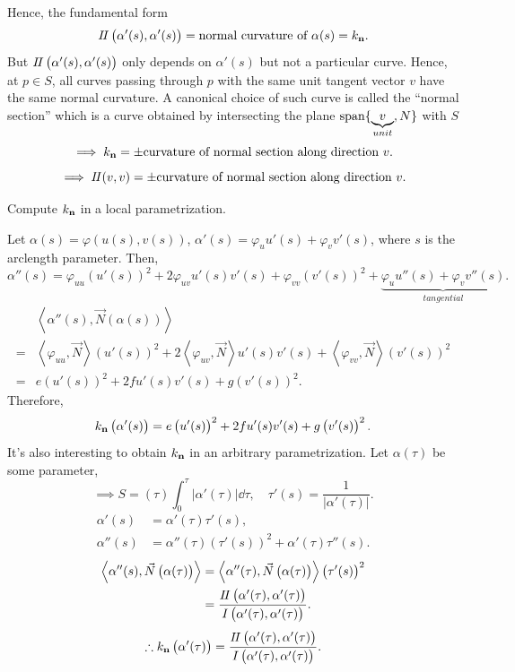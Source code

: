 Hence, the  fundamental form
\[
    I\!I\left(\alpha'(s),\alpha'(s)\right)    
    =\text{normal curvature of }\alpha(s)=k_{\vb{n}}.
\]
But \(I\!I\left(\alpha'(s),\alpha'(s)\right)\) only depends on 
\(\alpha'(s)\) but not a particular curve. Hence, at \(p\in S\), 
all curves passing through \(p\) with the same unit tangent vector
\(v\) have the same normal curvature. A canonical choice of
such curve is called the ``normal section'' which is a curve 
obtained by intersecting the plane \(\operatorname{span}\{\underbrace{v}_{unit},N\}\)
with \(S\)
\[
    \implies k_{\vb{n}}=\pm \text{curvature of normal section along
    direction }v.
\]
\[
    \implies I\!I(v,v)= \pm \text{curvature of normal section along
    direction }v.   
\]
\begin{exercise}
    Compute \(k_{\vb{n}}\) in a local parametrization.

    Let \(\alpha(s)=\varphi\left(u(s),v(s)\right)\), 
    \(\alpha'(s)=\varphi_u u'(s)+\varphi_v v'(s)\), where \(s\)
    is the arclength parameter. Then, 
    \[
        \alpha''(s)=\varphi_{uu}\left(u'(s)\right)^2 +2\varphi_{uv}
        u'(s)v'(s)+\varphi_{vv}\left(v'(s)\right)^2
        +\underbrace{\varphi_u u''(s)+\varphi_v v''(s)}_{tangential}.
    \]
    \begin{align*}
        &\left\langle \alpha''(s),
        \vec{N}\left(\alpha(s)\right)\right\rangle\\
        =&\left\langle \varphi_{uu},\vec{N}\right\rangle
        \left(u'(s)\right)^2 +2\left\langle\varphi_{uv},
        \vec{N}\right\rangle u'(s)v'(s)+\left\langle
        \varphi_{vv},\vec{N}\right\rangle\left(v'(s)\right)^2\\
        =&e \left(u'(s)\right)^2+2fu'(s)v'(s)+g\left(v'(s)\right)^2
    .\end{align*}
    Therefore, 
    \[
        k_{\vb{n}}\left(\alpha'(s)\right)=
        e \left(u'(s)\right)^2+2fu'(s)v'(s)+g\left(v'(s)\right)^2.
    \]
    It's also interesting to obtain \(k_{\vb{n}}\) in an 
    arbitrary parametrization. Let \(\alpha(\tau)\) be some parameter,
    \[
        \implies
        S=\left(\tau\right)    \int_0^\tau \left|\alpha'(\tau)\right|
        \dd \tau
        ,\quad \tau'(s)=\frac{1}{\left|\alpha'(\tau)\right|}.
    \]
    \begin{align*}
        \alpha'(s)&=\alpha'(\tau)\tau'(s),\\
        \alpha''(s)&=\alpha''(\tau)\left(\tau'(s)\right)^2+
        \alpha'(\tau)\tau''(s).
    \end{align*}
    \begin{align*}
        \left\langle\alpha''(s),\vec{N}\left(\alpha(\tau)\right)
        \right\rangle
        &=\left\langle\alpha''(\tau),\vec{N}\left(\alpha(\tau)\right)
        \right\rangle\left(\tau'(s)\right)^2\\
        &=\frac{I\!I\left(\alpha'(\tau),\alpha'(\tau)\right)}{
            I\left(\alpha'(\tau),\alpha'(\tau)\right)
        }.
    \end{align*}
    \[
        \therefore   k_{\vb{n}}\left(\alpha'(\tau)\right)
        =\frac{I\!I\left(\alpha'(\tau),\alpha'(\tau)\right)}{
            I\left(\alpha'(\tau),\alpha'(\tau)\right)
        }.
    \]
\end{exercise}
